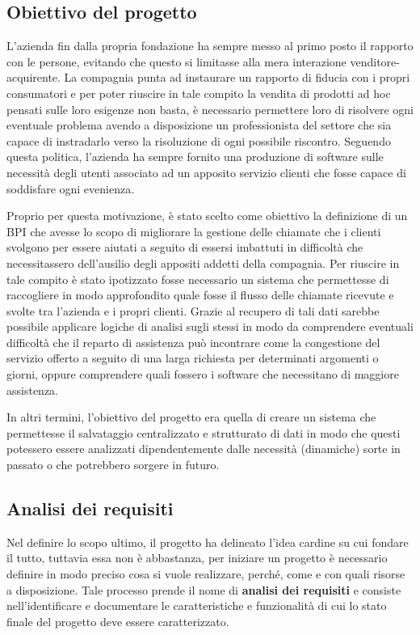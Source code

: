 \subsection{Obiettivo del progetto}

L'azienda fin dalla propria fondazione ha sempre messo al primo posto il rapporto con le persone, evitando che questo si limitasse alla mera interazione venditore-acquirente. La compagnia punta ad instaurare un rapporto di fiducia con i propri consumatori e per poter riuscire in tale compito la vendita di prodotti ad hoc pensati sulle loro esigenze non basta, è necessario permettere loro di risolvere ogni eventuale problema avendo a disposizione un professionista del settore che sia capace di instradarlo verso la risoluzione di ogni possibile riscontro. Seguendo questa politica, l'azienda ha sempre fornito una produzione di software sulle necessità degli utenti associato ad un apposito servizio clienti che fosse capace di soddisfare ogni evenienza.

Proprio per questa motivazione, è stato scelto come obiettivo la definizione di un BPI che avesse lo scopo di migliorare la gestione delle chiamate che i clienti svolgono per essere aiutati a seguito di essersi imbattuti in difficoltà che necessitassero dell'ausilio degli appositi addetti della compagnia. Per riuscire in tale compito è stato ipotizzato fosse necessario un sistema che permettesse di raccogliere in modo approfondito quale fosse il flusso delle chiamate ricevute e svolte tra l'azienda e i propri clienti. Grazie al recupero di tali dati sarebbe possibile applicare logiche di analisi sugli stessi in modo da comprendere eventuali difficoltà che il reparto di assistenza può incontrare come la congestione del servizio offerto a seguito di una larga richiesta per determinati argomenti o giorni, oppure comprendere quali fossero i software che necessitano di maggiore assistenza.

In altri termini, l'obiettivo del progetto era quella di creare un sistema che permettesse il salvataggio centralizzato e strutturato di dati in modo che questi potessero essere analizzati dipendentemente dalle necessità (dinamiche) sorte in passato o che potrebbero sorgere in futuro.

\subsection{Analisi dei requisiti}

Nel definire lo scopo ultimo, il progetto ha delineato l'idea cardine su cui fondare il tutto, tuttavia essa non è abbastanza, per iniziare un progetto è necessario definire in modo preciso cosa si vuole realizzare, perché, come e con quali risorse a disposizione. Tale processo prende il nome di \textbf{analisi dei requisiti} e consiste nell'identificare e documentare le caratteristiche e funzionalità di cui lo stato finale del progetto deve essere caratterizzato.

